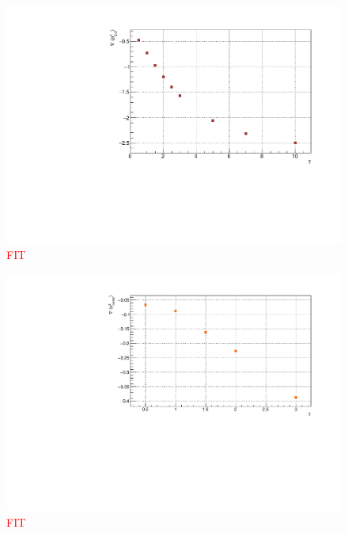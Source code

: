 \begin{figure}[H]
    \centering
    \includegraphics[scale=0.7]{Figures/8sites_comparison/8sites_gradLM_2and3VSgamma.pdf}
    \caption{\textcolor{red}{FIT}}
    \label{fig:my_label}
\end{figure}

\begin{figure}[H]
    \centering
    \includegraphics[scale=0.7]{Figures/12sites/12sites_gradLM_centerChainVSgamma.pdf}
    \caption{\textcolor{red}{FIT}}
    \label{fig:my_label}
\end{figure}

